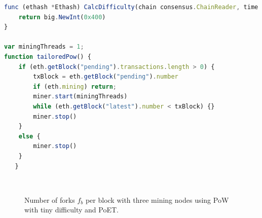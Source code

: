 \begin{lstlisting}[language=JavaScript,caption={Defined functions that specify the block difficulty and the tailored PoW.}, label={lst:tailorPow}]
func (ethash *Ethash) CalcDifficulty(chain consensus.ChainReader, time uint64, parent *types.Header) *big.Int {
    return big.NewInt(0x400)
}

var miningThreads = 1;
function tailoredPow() {
    if (eth.getBlock("pending").transactions.length > 0) {
        txBlock = eth.getBlock("pending").number
        if (eth.mining) return;
        miner.start(miningThreads)
        while (eth.getBlock("latest").number < txBlock) {}
        miner.stop()
    }
    else {
        miner.stop()
    }
   }
\end{lstlisting}

\begin{figure}[bth]
	\myfloatalign
	 \quad
	 \\
	\caption{Number of forks $f_b$ per block with three mining nodes using PoW with tiny difficulty and PoET.}
	\label{fig:forks}
\end{figure}

